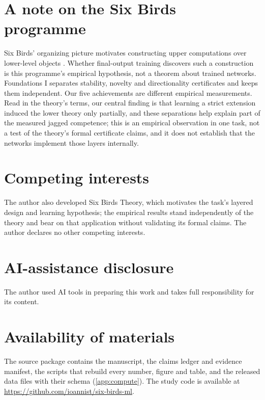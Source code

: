\section*{A note on the Six Birds programme}
Six Birds' organizing picture motivates constructing upper computations over
lower-level objects \citep[\S1.1]{tsiokos2026foundations}. Whether
final-output training discovers such a construction is this programme's
empirical hypothesis, not a theorem about trained networks. Foundations I
separates stability, novelty and directionality certificates and keeps them
independent. Our five
achievements are different empirical measurements. Read in the theory's
terms, our central finding is that learning a strict extension induced the
lower theory only partially, and these separations help explain part of the
measured jagged competence; this is an empirical observation in one task, not a test of
the theory's formal certificate claims, and it does not establish that the
networks implement those layers internally.

\section*{Competing interests}
The author also developed Six Birds Theory, which motivates the task's
layered design and learning hypothesis; the empirical results stand
independently of the theory and bear on that application without validating
its formal claims. The author declares no other competing interests.

\section*{AI-assistance disclosure}
The author used AI tools in preparing this work and takes full responsibility
for its content.

\section*{Availability of materials}
The source package contains the manuscript, the claims ledger and evidence
manifest, the scripts that rebuild every number, figure and table, and the
released data files with their schema (\cref{app:compute}). The study code is
available at \url{https://github.com/ioannist/six-birds-ml}.
